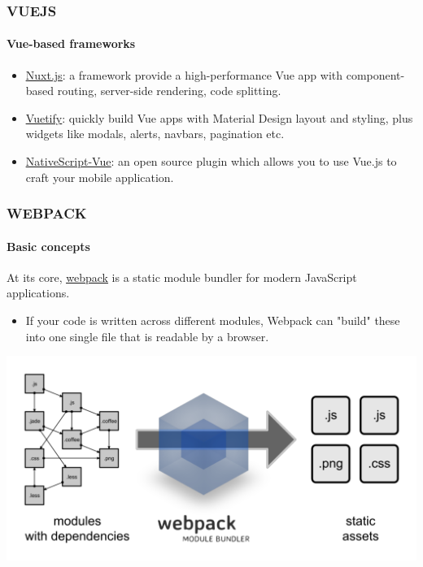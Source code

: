 \documentclass[10pt]{beamer}
\begin{document}
\begin{frame}
    \frametitle{\textbf{VUEJS}}
    \framesubtitle{\textbf{Vue-based frameworks}}
    \begin{itemize}
        \item \href{https://nuxtjs.org/}{\underline{Nuxt.js}}: a framework provide  a high-performance Vue app with component-based routing, server-side rendering, code splitting.
        \item \href{https://vuetifyjs.com/en/}{\underline{Vuetify}}: quickly build Vue apps with Material Design layout and styling, plus widgets like modals, alerts, navbars, pagination etc.
        \item \href{https://nativescript-vue.org/}{\underline{NativeScript-Vue}}: an open source plugin which allows you to use Vue.js to craft your mobile application.
    \end{itemize}
\end{frame}
\begin{frame}
    \frametitle{\textbf{WEBPACK}}
    \framesubtitle{\textbf{Basic concepts}}
    \begin{definition}[Webpack]
        At its core, \href{https://webpack.js.org/}{\underline{webpack}} is a static module bundler for modern JavaScript applications.
    \end{definition}
    \begin{itemize}
        \item If your code is written across different modules, Webpack can "build" these into one single file that is readable by a browser.
    \end{itemize}
    {\centering\includegraphics[scale=0.25]{webpack_overview.png}\par}
\end{frame}
\end{document}
